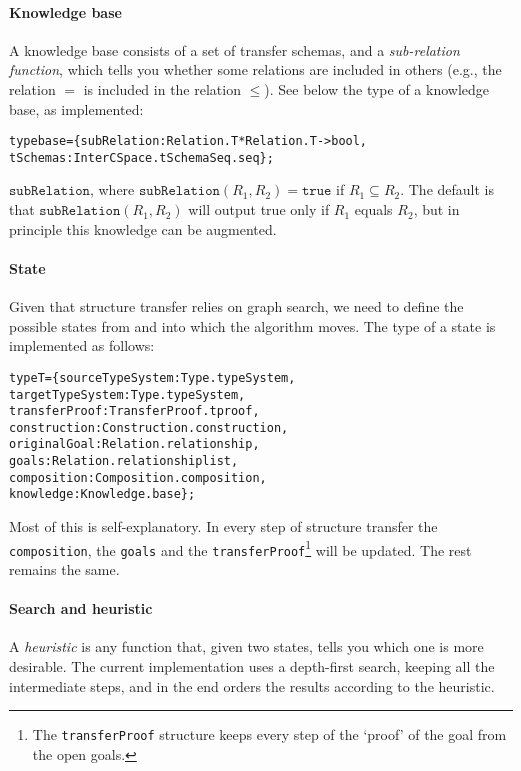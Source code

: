 \documentclass[a4paper]{article}
\theoremstyle{definition}
\begin{document}
	\paragraph{Knowledge base} A knowledge base consists of a set of transfer schemas, and a \textit{sub-relation function}, which tells you whether some relations are included in others (e.g., the relation $=$ is included in the relation $\leq$). See below the type of a knowledge base, as implemented:
	\begin{alltt}
type base = \{subRelation : Relation.T * Relation.T -> bool,
             tSchemas : InterCSpace.tSchema Seq.seq\};
	\end{alltt}
	 $\mathtt{subRelation}$, where $\mathtt{subRelation}(R_1,R_2) = \mathtt{true}$ if $R_1 \subseteq R_2$. The default is that $\mathtt{subRelation}(R_1,R_2)$ will output true only if $R_1$ equals $R_2$, but in principle this knowledge can be augmented.

	\paragraph{State}
	 Given that structure transfer relies on graph search, we need to define the possible states from and into which the algorithm moves. The type of a state is implemented as follows:
\begin{alltt}
type T = \{sourceTypeSystem : Type.typeSystem,
          targetTypeSystem : Type.typeSystem,
          transferProof : TransferProof.tproof,
          construction : Construction.construction,
          originalGoal : Relation.relationship,
          goals : Relation.relationship list,
          composition : Composition.composition,
          knowledge : Knowledge.base\};
\end{alltt}
	Most of this is self-explanatory.
	In every step of structure transfer the \texttt{composition}, the \texttt{goals} and the \texttt{transferProof}\footnote{The \texttt{transferProof} structure keeps every step of the `proof' of the goal from the open goals.} will be updated. The rest remains the same.

	\paragraph{Search and heuristic}
	A \textit{heuristic} is any function that, given two states, tells you which one is more desirable. The current implementation uses a depth-first search, keeping all the intermediate steps, and in the end orders the results according to the heuristic.
\end{document}
